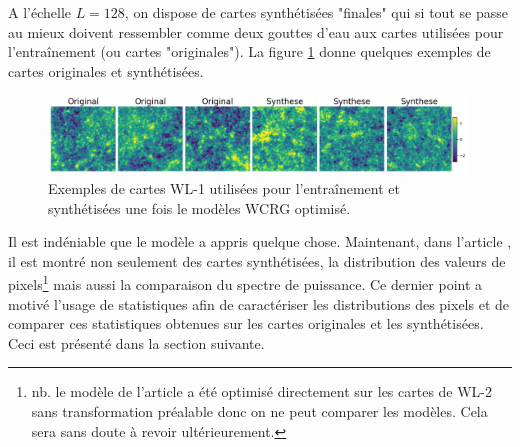 \documentclass[12pt,twoside]{article}
\begin{document}
A l'échelle $L=128$, on dispose de cartes synthétisées "finales" qui si tout se passe au mieux doivent ressembler comme deux gouttes d'eau aux cartes utilisées pour l'entraînement (ou cartes "originales"). La figure \ref{fig-WL1-synt-exemples} donne quelques exemples de cartes originales et synthétisées.
%
\begin{figure}
\centering
\includegraphics[width=0.99\textwidth]{fig-WL1-synt-exemples.png}
\caption{Exemples de cartes WL-1 utilisées pour l'entraînement et synthétisées une fois le modèles WCRG optimisé.}
\label{fig-WL1-synt-exemples}
\end{figure}
% 
Il est indéniable que le modèle a appris quelque chose. Maintenant, dans l'article \cite{2023arXiv230600181G}, il est montré non seulement des cartes synthétisées, la distribution des valeurs de pixels\footnote{nb. le modèle de l'article a été optimisé directement sur les cartes de WL-2 sans transformation préalable donc on ne peut comparer les modèles. Cela sera sans doute à revoir ultérieurement.} mais aussi la comparaison  du spectre de puissance. Ce dernier point a motivé l'usage de statistiques afin de caractériser les distributions des pixels et de comparer ces statistiques obtenues sur les cartes originales et les synthétisées. Ceci est présenté dans la section suivante.
%
\end{document}
